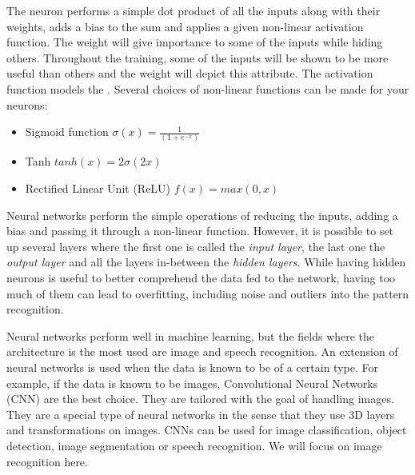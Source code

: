 

The neuron performs a simple dot product of all the inputs along with their weights, adds a bias to the sum and applies a given non-linear activation function. The weight will give importance to some of the inputs while hiding others. Throughout the training, some of the inputs will be shown to be more useful than others and the weight will depict this attribute. The activation function models the . Several choices of non-linear functions can be made for your neurons:
\begin{itemize}
  \item Sigmoid function $\sigma(x) = \frac{1}{(1+e^{-x})}$
  \item Tanh $tanh(x) = 2\sigma(2x)$
  \item Rectified Linear Unit (ReLU) $ f(x) = max(0,x) $
\end{itemize}

Neural networks perform the simple operations of reducing the inputs, adding a bias and passing it through a non-linear function. However, it is possible to set up several layers where the first one is called the \emph{input layer}, the last one the \emph{output layer} and all the layers in-between the \emph{hidden layers}. While having hidden neurons is useful to better comprehend the data fed to the network, having too much of them can lead to overfitting, including noise and outliers into the pattern recognition.

Neural networks perform well in machine learning, but the fields where the architecture is the most used are image and speech recognition. An extension of neural networks is used when the data is known to be of a certain type. For example, if the data is known to be images, Convolutional Neural Networks (CNN) are the best choice. They are tailored with the goal of handling images. They are a special type of neural networks in the sense that they use 3D layers and transformations on images. CNNs can be used for image classification, object detection, image segmentation or speech recognition. We will focus on image recognition here.

